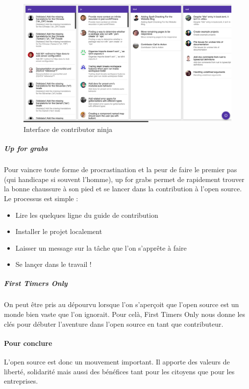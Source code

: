 				\begin{figure}[!htb]
					\center
					\includegraphics[scale=0.30]{./img/ninja_os}
					\caption{Interface de contributor ninja}					
				\end{figure}

				\subparagraph{Up for grabs}

				Pour vaincre toute forme de procrastination et la peur de faire le premier pas (qui handicape si souvent l'homme), up for grabs permet de rapidement trouver la bonne chaussure à son pied et se lancer dans la contribution à l'open source. Le processus est simple :

				\begin{itemize}[label=\textbullet, font=\LARGE \color{burntorange}]
					\item Lire les quelques ligne du guide de contribution
					\item Installer le projet localement
					\item Laisser un message sur la tâche que l'on s'apprête à faire
					\item Se lançer dans le travail !
				\end{itemize}

				\subparagraph{First Timers Only}

				On peut être pris au dépourvu lorsque l'on s'aperçoit que l'open source est un monde bien vaste que l'on ignorait. Pour celà, First Timers Only nous donne les clés pour débuter l'aventure dans l'open source en tant que contributeur.
		
		\paragraph{Pour conclure\\}

			L’open source est donc un mouvement important. Il apporte des valeurs de liberté, solidarité mais aussi des bénéfices tant pour les citoyens que pour les entreprises. 
		
